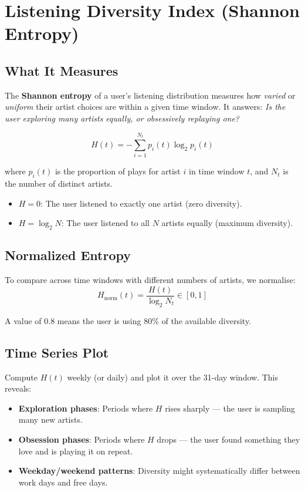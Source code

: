 \documentclass[12pt, a4paper]{article}
\begin{document}
\section{Listening Diversity Index (Shannon Entropy)}

\subsection{What It Measures}

The \textbf{Shannon entropy} of a user's listening distribution measures how
\emph{varied} or \emph{uniform} their artist choices are within a given
time window. It answers: \emph{Is the user exploring many artists equally,
or obsessively replaying one?}

\[
    H(t) = -\sum_{i=1}^{N_t} p_i(t) \log_2 p_i(t)
\]

where $p_i(t)$ is the proportion of plays for artist $i$ in time window $t$,
and $N_t$ is the number of distinct artists.

\begin{itemize}
    \item $H = 0$: The user listened to exactly one artist (zero diversity).
    \item $H = \log_2 N$: The user listened to all $N$ artists equally
          (maximum diversity).
\end{itemize}

\subsection{Normalized Entropy}

To compare across time windows with different numbers of artists, we
normalise:
\[
    H_{\text{norm}}(t) = \frac{H(t)}{\log_2 N_t} \in [0, 1]
\]

A value of 0.8 means the user is using 80\% of the available diversity.

\subsection{Time Series Plot}

Compute $H(t)$ weekly (or daily) and plot it over the 31-day window. This
reveals:
\begin{itemize}
    \item \textbf{Exploration phases}: Periods where $H$ rises sharply ---
          the user is sampling many new artists.
    \item \textbf{Obsession phases}: Periods where $H$ drops --- the user
          found something they love and is playing it on repeat.
    \item \textbf{Weekday/weekend patterns}: Diversity might systematically
          differ between work days and free days.
\end{itemize}
\end{document}
